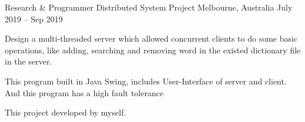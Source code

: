 \begin{cventries}
\cventry
    {Research \& Programmer} %
    {Distributed System Project} %
    {Melbourne, Australia} %
    {July 2019 – Sep 2019} %
    {
      \begin{cvitems} %
        \item {Design a multi-threaded server which allowed concurrent clients to do some basic operations, like adding, searching and removing word in the existed dictionary file in the server.}
        \item {This program built in Java Swing, includes User-Interface of server and client. And this program has a high fault tolerance}
        \item {This project developed by myself.}
      \end{cvitems}
    }

\end{cventries}
